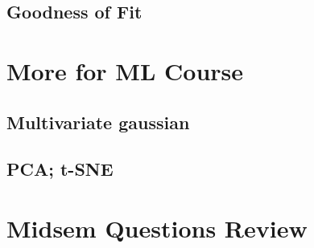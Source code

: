 \documentclass[4pt]{beamer} %
\begin{document}
\subsection{Goodness of Fit}
{


}
\section{More for ML Course}
\subsection{Multivariate gaussian}
{

}

\subsection{PCA; t-SNE}
{

}

\section{Midsem Questions Review}
{



}
\end{document}
